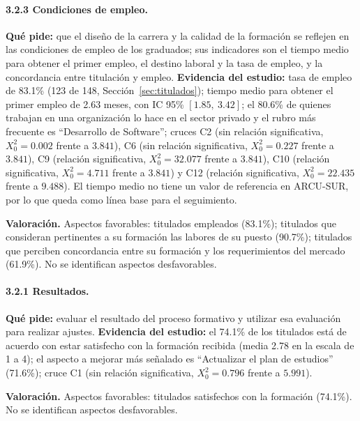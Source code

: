 \paragraph{3.2.3 Condiciones de empleo.} \textbf{Qué pide:} que el diseño de la carrera y la calidad de la formación se reflejen en las condiciones de empleo de los graduados; sus indicadores son el tiempo medio para obtener el primer empleo, el destino laboral y la tasa de empleo, y la concordancia entre titulación y empleo. \textbf{Evidencia del estudio:} tasa de empleo de 83.1\% (123 de 148, Sección~\ref{sec:titulados}); tiempo medio para obtener el primer empleo de 2.63 meses, con IC 95\% $[1.85,\ 3.42]$; el 80.6\% de quienes trabajan en una organización lo hace en el sector privado y el rubro más frecuente es ``Desarrollo de Software''; cruces C2 (sin relación significativa, $X_0^2 = 0.002$ frente a $3.841$), C6 (sin relación significativa, $X_0^2 = 0.227$ frente a $3.841$), C9 (relación significativa, $X_0^2 = 32.077$ frente a $3.841$), C10 (relación significativa, $X_0^2 = 4.711$ frente a $3.841$) y C12 (relación significativa, $X_0^2 = 22.435$ frente a $9.488$). El tiempo medio no tiene un valor de referencia en ARCU-SUR, por lo que queda como línea base para el seguimiento.

\textbf{Valoración.} Aspectos favorables: titulados empleados (83.1\%); titulados que consideran pertinentes a su formación las labores de su puesto (90.7\%); titulados que perciben concordancia entre su formación y los requerimientos del mercado (61.9\%). No se identifican aspectos desfavorables.

\paragraph{3.2.1 Resultados.} \textbf{Qué pide:} evaluar el resultado del proceso formativo y utilizar esa evaluación para realizar ajustes. \textbf{Evidencia del estudio:} el 74.1\% de los titulados está de acuerdo con estar satisfecho con la formación recibida (media 2.78 en la escala de 1 a 4); el aspecto a mejorar más señalado es ``Actualizar el plan de estudios'' (71.6\%); cruce C1 (sin relación significativa, $X_0^2 = 0.796$ frente a $5.991$).

\textbf{Valoración.} Aspectos favorables: titulados satisfechos con la formación (74.1\%). No se identifican aspectos desfavorables.

